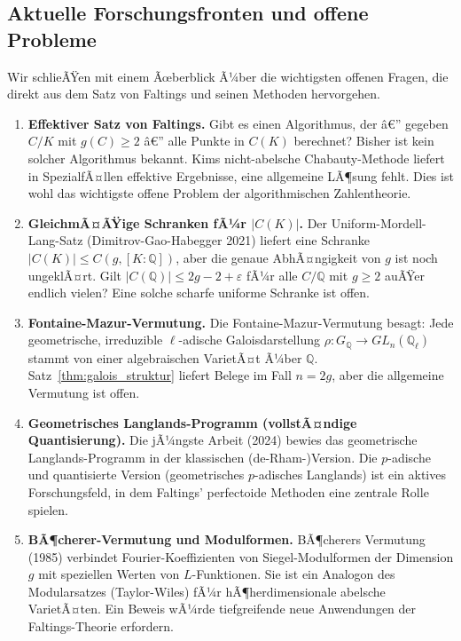 ﻿\documentclass[12pt,a4paper]{article}
\theoremstyle{plain}
\theoremstyle{definition}
\theoremstyle{remark}
\newcommand{\Q}{\mathbb{Q}}
\begin{document}
\subsection{Aktuelle Forschungsfronten und offene Probleme}

Wir schlieÃŸen mit einem Ãœberblick Ã¼ber die wichtigsten offenen Fragen, die direkt
aus dem Satz von Faltings und seinen Methoden hervorgehen.

\begin{enumerate}[leftmargin=2em,itemsep=6pt, label=\textbf{(\arabic*)}]
  \item \textbf{Effektiver Satz von Faltings.}
    Gibt es einen Algorithmus, der â€” gegeben $C/K$ mit $g(C) \geq 2$ â€”
    alle Punkte in $C(K)$ berechnet? Bisher ist kein solcher Algorithmus bekannt.
    Kims nicht-abelsche Chabauty-Methode liefert in SpezialfÃ¤llen effektive Ergebnisse,
    eine allgemeine LÃ¶sung fehlt. Dies ist wohl das wichtigste offene Problem
    der algorithmischen Zahlentheorie.

  \item \textbf{GleichmÃ¤ÃŸige Schranken fÃ¼r $|C(K)|$.}
    Der Uniform-Mordell-Lang-Satz (Dimitrov-Gao-Habegger 2021) liefert eine
    Schranke $|C(K)| \leq C(g, [K:\Q])$, aber die genaue AbhÃ¤ngigkeit von $g$
    ist noch ungeklÃ¤rt. Gilt $|C(\Q)| \leq 2g - 2 + \varepsilon$ fÃ¼r alle
    $C/\Q$ mit $g \geq 2$ auÃŸer endlich vielen? Eine solche scharfe uniforme Schranke
    ist offen.

  \item \textbf{Fontaine-Mazur-Vermutung.}
    Die Fontaine-Mazur-Vermutung besagt: Jede geometrische, irreduzible
    $\ell$-adische Galoisdarstellung $\rho: G_\Q \to GL_n(\Q_\ell)$
    stammt von einer algebraischen VarietÃ¤t Ã¼ber $\Q$. Satz~\ref{thm:galois_struktur}
    liefert Belege im Fall $n = 2g$, aber die allgemeine Vermutung ist offen.

  \item \textbf{Geometrisches Langlands-Programm (vollstÃ¤ndige Quantisierung).}
    Die jÃ¼ngste Arbeit (2024) bewies das geometrische Langlands-Programm in der
    klassischen (de-Rham-)Version. Die $p$-adische und quantisierte Version
    (geometrisches $p$-adisches Langlands) ist ein aktives Forschungsfeld, in dem
    Faltings' perfectoide Methoden eine zentrale Rolle spielen.

  \item \textbf{BÃ¶cherer-Vermutung und Modulformen.}
    BÃ¶cherers Vermutung (1985) verbindet Fourier-Koeffizienten von
    Siegel-Modulformen der Dimension $g$ mit speziellen Werten von
    $L$-Funktionen. Sie ist ein Analogon des Modularsatzes (Taylor-Wiles)
    fÃ¼r hÃ¶herdimensionale abelsche VarietÃ¤ten. Ein Beweis wÃ¼rde tiefgreifende
    neue Anwendungen der Faltings-Theorie erfordern.


\end{enumerate}
\end{document}
